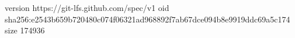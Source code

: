 version https://git-lfs.github.com/spec/v1
oid sha256:e2543b659b720480c074f06321ad968892f7ab67dce094b8e9919ddc69a5c174
size 174936
